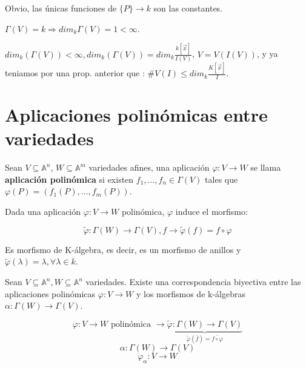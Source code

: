  Obvio, las únicas funciones de $\{P\} \rightarrow k$ son las constantes.

 $\Gamma(V)=k \Rightarrow dim_k \Gamma(V)=1<\infty $.

 $dim_k(\Gamma(V))<\infty, dim_k(\Gamma(V))= dim_k \frac{k[\vec{x}]}{I(V)}$, $V=V(I(V))$, y ya teniamos por una prop. anterior que : $\# V(I) \le dim_k \frac{K[\vec{x}]}{I}$.

\section{Aplicaciones polinómicas entre variedades}

\begin{Def}
Sean $V\subseteq \mathbb{A}^n$, $W\subseteq \mathbb{A}^m$ variedades afines, una aplicación $\varphi : V \rightarrow W$ se llama \textbf{aplicación polinómica} si existen $f_1,\dots,f_n\in \Gamma(V)$ tales que $\varphi(P)=(f_1(P),\dots, f_m(P))$.
\end{Def}

Dada una aplicación $\varphi: V \rightarrow W$ polinómica, $\varphi$ induce el morfismo: 

$$\tilde{\varphi}: \Gamma(W)\rightarrow \Gamma(V), f\rightarrow \tilde{\varphi}(f)=f\circ \varphi$$

Es morfismo de K-álgebra, es decir, es un morfismo de anillos y $\tilde{\varphi}(\lambda)=\lambda, \forall \lambda\in k$.

\begin{Prop}
Sean $V\subseteq \mathbb{A}^n, W\subseteq \mathbb{A}^n$ variedades. Existe una correspondencia biyectiva entre las aplicaciones polinómicas $\varphi: V\rightarrow W$ y los morfismos de k-álgebras $\alpha: \Gamma(W)\rightarrow \Gamma(V)$. 

$$ \varphi : V\rightarrow W \text{ polinómica } \longrightarrow \underbrace{\tilde{\varphi}: \Gamma(W)\rightarrow \Gamma(V)}_{\tilde{\varphi}(\bar{f})=\bar{f\circ \varphi}}$$
$$\alpha: \Gamma(W)\rightarrow \Gamma(V)$$
$$\varphi_\alpha: V\rightarrow W $$ 
\end{Prop}

